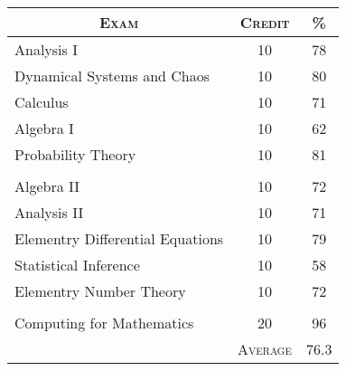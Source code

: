 \documentclass[a4paper]{article}
\begin{document}
\begin{center}
\begin{tabular}{lcc}

\multicolumn{1}{c}{\textsc{Exam}} & \textsc{Credit}&\textsc{\%}\\ \hline
Analysis I & 10 & 78\\
Dynamical Systems and Chaos & 10 & 80\\
Calculus & 10 & 71\\
Algebra I & 10 & 62\\
Probability Theory & 10 & 81\\
\\
Algebra II & 10 & 72\\
Analysis II & 10 & 71\\
Elementry Differential Equations & 10 & 79\\
Statistical Inference & 10 & 58\\
Elementry Number Theory & 10 & 72\\
\\
Computing for Mathematics & 20 & 96\\
\cline{2-3}
&\textsc{Average}&76.3

\end{tabular}
\end{center}
\bigskip
\end{document}
